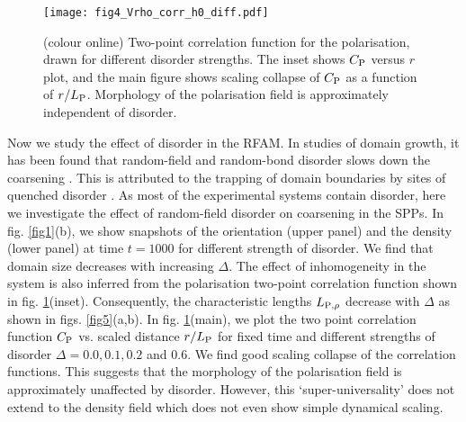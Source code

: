 \documentclass[pre,twocolumn,amssymb,showpacs,superscriptaddress,notitlepage]{revtex4-1}
\begin{document}

\begin{figure}[b]
  \begin{center}
  \texttt{[image: fig4\_Vrho\_corr\_h0\_diff.pdf]}
\caption{(colour online)
Two-point correlation function for the  polarisation, drawn for different disorder strengths. 
The inset shows $C_{\rm  P}$ versus $r$ plot, and the main figure shows  scaling collapse of $C_{\rm  P}$ as a function 
of $r/L_{\rm  P}$.  Morphology of the polarisation field is approximately independent of disorder.} 
\label{fig4}
\end{center}
\end{figure}


Now we study the effect of disorder in the RFAM. 
In studies of domain growth, it has been found that random-field 
and random-bond disorder slows down the coarsening 
\cite{puriepl2017, huse1985prl, lai1988prb, puriparekh1992, paulpurireiger2004, purizannetti2011}.
This is attributed to the trapping of domain boundaries by sites of quenched disorder \cite{puriepl2017, huse1985prl, lai1988prb}. 
As most of the experimental 
systems contain disorder,  here we investigate the effect of random-field disorder on coarsening in the SPPs.
In fig. \ref{fig1}(b), we show snapshots of the orientation (upper panel) and the density (lower panel) 
at time $t=1000$ for different strength of disorder. We find that domain size decreases with increasing $\Delta$. The effect of 
inhomogeneity in the system is also inferred  from the  polarisation
 two-point correlation function shown in fig. \ref{fig4}(inset). 
Consequently, the characteristic lengths $L_{\rm  P,\rho}$ decrease with $\Delta$ as shown in figs. \ref{fig5}(a,b).
In fig. \ref{fig4}(main), we plot the two point correlation function $C_{\rm  P}$ vs. scaled distance $r/L_{\rm  P}$ 
for fixed time and different strengths of disorder $\Delta =0.0, 0.1, 0.2$ and $0.6$. We find good scaling collapse of the correlation 
functions. This suggests that the morphology of the polarisation field is approximately unaffected by disorder. However, this 
`super-universality' \cite{purichowparekh1991} does not extend to the density field which does not even show simple dynamical scaling.
\end{document}
